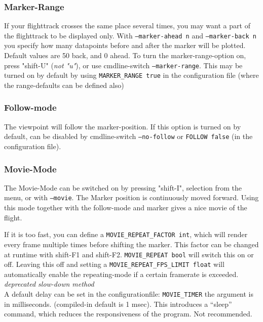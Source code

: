 \subsubsection{Marker-Range}

If your flighttrack crosses the same place several times, you may want a part of
the flighttrack to be displayed only. With \texttt{--marker-ahead n}  and \texttt{--marker-back n}
you specify how many datapoints before and after the marker will be plotted. Default values are
50 back, and 0 ahead. To turn the marker-range-option on, press "shift-U" (\emph{not "u"}), or use
cmdline-switch \texttt{--marker-range}. This may be turned on by default by using
\texttt{MARKER\_RANGE true} in the configuration file (where the range-defaults can be defined
also)

\subsubsection{Follow-mode}

The viewpoint will follow the marker-position. If this option is turned on by
default, can be disabled by cmdline-switch \texttt{--no-follow} or \texttt{FOLLOW false} (in  the configuration file).


\subsubsection{Movie-Mode}
\label{movie}
The Movie-Mode can be switched on by pressing "shift-I", selection from the menu, or with \texttt{--movie}.
The Marker position is continuously moved forward.
Using this mode together with the follow-mode and marker gives a nice movie of the flight.

If it is too fast, you can define a \texttt{MOVIE\_REPEAT\_FACTOR int}, which will render every frame multiple times before shifting the marker. This factor can be changed at runtime with shift-F1 and shift-F2.
\texttt{MOVIE\_REPEAT bool} will switch this on or off. Leaving this off and setting a \texttt{MOVIE\_REPEAT\_FPS\_LIMIT float} will  automatically enable the repeating-mode if a certain framerate is exceeded. \\

\emph{deprecated slow-down method} \\
A default delay can be set in the configurationfile:
\texttt{MOVIE\_TIMER} the argument is in milliseconds. (compiled-in default is 1 msec).
This introduces a ``sleep'' command, which reduces the responsiveness of the program. Not recommended.


